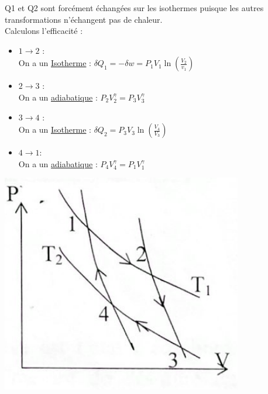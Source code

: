 \documentclass[12pt,oneside]{book}
\begin{document}
\begin{itemize}
          Q1 et Q2 sont forcément échangées sur les isothermes puisque les autres transformations n'échangent pas de chaleur. \\
          Calculons l’efficacité :\\
          \begin{minipage}{0.6\linewidth}
              \begin{itemize}
                  \item $1\to 2$ :\\
                        On a un \underline{Isotherme} : $\delta Q_1 = -\delta w = P_1V_1\ln(\frac{V_2}{v_1})$
                  \item $2 \to 3$ : \\
                        On a un \underline{adiabatique} : $P_2V_2^\gamma = P_3V_3^\gamma$
                  \item $3 \to 4$ : \\
                        On a un \underline{Isotherme} : $\delta Q_2 = P_3V_3\ln(\frac{V_4}{V_3})$
                  \item $4 \to 1 :$\\
                        On a un \underline{adiabatique} : $P_4V_4^\gamma = P_1V_1^\gamma$
              \end{itemize}
          \end{minipage}
          \begin{minipage}{0.4\linewidth}
              \includegraphics[width=\linewidth]{../pic/3300/4}

\end{minipage}
\end{itemize}
\end{document}
